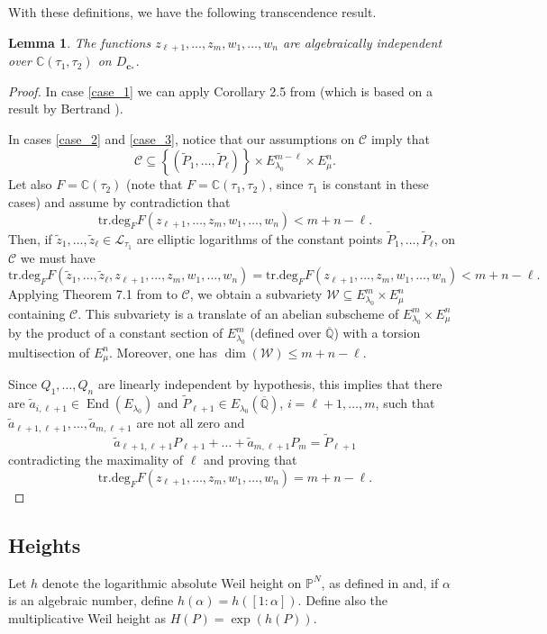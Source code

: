 \documentclass[11pt,a4paper,reqno]{amsart}
\numberwithin{equation}{section}
\newcommand{\C}{\mathbb{C}}
\renewcommand{\P}{\mathbb{P}}
\newcommand{\Qal}{\overline{\mathbb{Q}}}
\renewcommand{\c}{\mathcal{C}}
\newcommand{\cc}{\mathbf{c}}
\renewcommand{\a}{\alpha}
\renewcommand{\l}{\lambda}
\newcommand{\m}{\mu}
\newcommand{\pt}[1]{\left( #1 \right)}
\newcommand{\pq}[1]{\left[ #1 \right]}
\newcommand{\pg}[1]{\left\lbrace #1 \right\rbrace}
\DeclareMathOperator{\en}{End}
\newtheorem{lemma}[theorem]{Lemma}
\theoremstyle{remark}
\theoremstyle{definition}
\theoremstyle{definition}
\begin{document}
With these definitions, we have the following transcendence result.
\begin{lemma}\label{lemma:func_transc_isog}
The functions $z_{\ell+1},\ldots,z_m, w_1, \ldots, w_n$ are algebraically independent over $\C(\tau_1, \tau_2)$ on $D_{\cc_{*}}$.
\end{lemma}
\begin{proof}
In case \ref{case_1} we can apply Corollary 2.5 from \cite{BC17} (which is based on a result by Bertrand \cite{Ber09}).

In cases \ref{case_2} and \ref{case_3}, notice that our assumptions on $\c$ imply that 
$$\c \subseteq \pg{\pt{\widetilde{P}_1, \ldots, \widetilde{P}_{\ell}}} \times E_{\l_0}^{m-\ell} \times E_{\m}^n.$$ 
Let also $F=\C\pt{\tau_2}$ (note that $F=\C(\tau_1, \tau_2)$, since $\tau_1$ is constant in these cases) and assume by contradiction that 
$$\mathrm{tr.deg}_F F\pt{z_{\ell+1}, \ldots, z_m, w_1, \ldots, w_n} < m+n-\ell.$$
Then, if $\widetilde{z}_1, \ldots, \widetilde{z}_{\ell} \in \mathcal{L}_{\tau_1}$ are elliptic logarithms of the constant points $\widetilde{P}_1, \ldots, \widetilde{P}_{\ell}$, on $\c$ we must have
$$\mathrm{tr.deg}_F F(\widetilde{z}_1, \ldots, \widetilde{z}_{\ell}, z_{\ell+1}, \ldots, z_m, w_1, \ldots, w_n ) =\mathrm{tr.deg}_F F\pt{z_{\ell+1}, \ldots, z_m, w_1, \ldots, w_n} < m+n-\ell.$$
Applying Theorem 7.1 from \cite{Dil21} to $\c$, we obtain a subvariety $\mathcal{W}\subseteq E_{\l_0}^m\times E_{\m}^n$ containing $\c$. This subvariety is a translate of an abelian subscheme of $E_{\l_0}^m \times E_{\m}^n$ by the product of a constant section of $E_{\l_0}^m$ (defined over $\Qal$) with a torsion multisection of $E_{\m}^n$. Moreover, one has $\dim(\mathcal{W}) \leq m+n-\ell$.

Since $Q_1, \ldots, Q_n$ are linearly independent by hypothesis, this implies that there are $\widetilde{a}_{i,\ell+1} \in \en(E_{\l_0})$ and $\widetilde{P}_{\ell+1} \in E_{\l_0}(\Qal)$, $i=\ell+1, \ldots, m$, such that $\widetilde{a}_{\ell+1,\ell+1}, \ldots, \widetilde{a}_{m,\ell+1}$ are not all zero and
$$\widetilde{a}_{\ell+1,\ell+1} P_{\ell+1} + \ldots + \widetilde{a}_{m,\ell+1} P_m=\widetilde{P}_{\ell+1}$$ 
contradicting the maximality of $\ell$ and proving that
\setlength{\belowdisplayskip}{-1em}
$$\mathrm{tr.deg}_F F\pt{z_{\ell+1}, \ldots, z_m, w_1, \ldots, w_n} = m+n-\ell.$$ 
\end{proof}


\subsection{Heights}
Let $h$ denote the logarithmic absolute Weil height on $\P^N$, as defined in \cite{BG06} and, if $\a$ is an algebraic number, define $h(\a)=h\pt{\pq{1:\a}}$. Define also the multiplicative Weil height as $H(P)=\exp(h(P))$.
\end{document}
